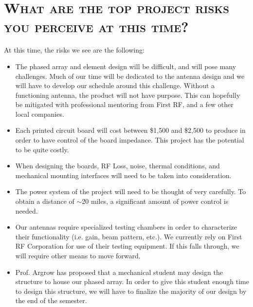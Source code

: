 \documentclass[11pt]{article}
\numberwithin{figure}{section}
\begin{document}
\section{\textsc{What are the top project risks you perceive at this time?}}
	At this time, the risks we see are the following:
	\begin{itemize}
		\item The phased array and element design will be difficult, and will pose many challenges.  Much of our time will be dedicated to the antenna design and we will have to develop our schedule around this challenge.  Without a functioning antenna, the product will not have purpose. This can hopefully be mitigated with professional mentoring from First RF, and a few other local companies. 
		\item Each printed circuit board will cost between \$1,500 and \$2,500 to produce in order to have control of the board impedance.  This project has the potential to be quite costly.
		\item When designing the boards, RF Loss, noise, thermal conditions, and mechanical mounting interfaces will need to be taken into consideration.
		\item The power system of the project will need to be thought of very carefully.  To obtain a distance of $\sim$20 miles, a significant amount of power control is needed.
		\item Our antennas require specialized testing chambers in order to characterize their functionality (i.e.  gain, beam pattern, etc.).  We currently rely on First RF Corporation for use of their testing equipment.  If this falls through, we will require other means to move forward.
		\item Prof.  Argrow has proposed that a mechanical student may design the structure to house our phased array.  In order to give this student enough time to design this structure, we will have to finalize the majority of our design by the end of the semester.  
	\end{itemize}
\end{document}
